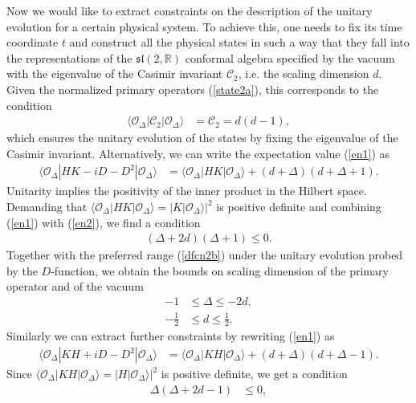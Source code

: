 \documentclass[12pt]{article}
\numberwithin{equation}{section}
\begin{document}
Now we would like to extract constraints on the description 
of the unitary evolution for a certain physical system. 
To achieve this, one needs to fix its time coordinate $t$ and construct all the physical states 
in such a way that they fall into the representations of the $\mathfrak{sl}(2,\mathbb{R})$ conformal algebra 
specified by the vacuum with the eigenvalue of the Casimir invariant $\mathcal{C}_{2}$, 
i.e. the scaling dimension $d$. 
Given the normalized primary operators (\ref{state2a}), 
this corresponds to the condition
\begin{align}
\label{en1}
\langle \mathcal{O}_{\Delta}|\mathcal{C}_{2}|\mathcal{O}_{\Delta}\rangle 
&=\mathcal{C}_{2}=d(d-1), 
\end{align}
which ensures the unitary evolution of the states by fixing the eigenvalue of the Casimir invariant. 
Alternatively, we can write the expectation value (\ref{en1}) as 
\begin{align}
\label{en2}
\langle \mathcal{O}_{\Delta}|HK-iD-D^{2}|\mathcal{O}_{\Delta}\rangle 
&=\langle \mathcal{O}_{\Delta}|HK|\mathcal{O}_{\Delta}\rangle 
+(d+\Delta)(d+\Delta+1). 
\end{align}
Unitarity implies the positivity of the inner product in the Hilbert space. 
Demanding that 
$\langle \mathcal{O}_{\Delta}|HK|\mathcal{O}_{\Delta}\rangle=
|K|\mathcal{O}_{\Delta}\rangle |^{2}$ is positive definite 
and combining (\ref{en1}) with (\ref{en2}), 
we find a condition 
\begin{align}
\label{en3}
(\Delta+2d)(\Delta+1)\le 0. 
\end{align}
Together with the preferred range (\ref{dfcn2b}) 
under the unitary evolution probed by the $D$-function, 
we obtain the bounds on scaling dimension 
of the primary operator and of the vacuum 
\begin{align}
\label{nogo1a1}
-1&\le \Delta \le -2d, \\
\label{nogo1a2}
-\frac12&\le d\le \frac12.
\end{align}
Similarly we can extract further constraints 
by rewriting (\ref{en1}) as 
\begin{align}
\label{en4}
\langle \mathcal{O}_{\Delta}|KH+iD-D^{2}|\mathcal{O}_{\Delta}\rangle
&=\langle \mathcal{O}_{\Delta}|KH|\mathcal{O}_{\Delta}\rangle
+(d+\Delta)(d+\Delta-1).
\end{align}
Since $\langle
\mathcal{O}_{\Delta}|KH|\mathcal{O}_{\Delta}\rangle
=|H|\mathcal{O}_{\Delta}\rangle|^{2}$ is positive definite, 
we get a condition 
\begin{align}
\label{en5}
\Delta(\Delta+2d-1)&\le 0, 
\end{align}
\end{document}
